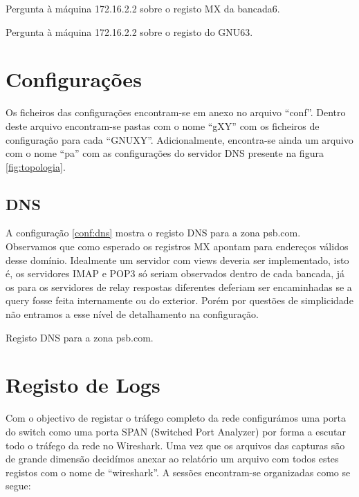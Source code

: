 \documentclass[a4paper,12pt]{article}
\begin{document}
\begin{program}
	
  \caption{Pergunta à máquina 172.16.2.2 sobre o registo MX da bancada6.}
	\label{log:172mx}
\end{program}

\begin{program}
	
  \caption{Pergunta à máquina 172.16.2.2 sobre o registo do GNU63.}
	\label{log:172a}
\end{program}


\section{Configurações}

Os ficheiros das configurações encontram-se em anexo no arquivo ``conf''.
Dentro deste arquivo encontram-se pastas com o nome ``gXY'' com os ficheiros
de configuração para cada ``GNUXY''. Adicionalmente, encontra-se ainda um
arquivo com o nome ``pa'' com as configurações do servidor DNS presente na 
figura \ref{fig:topologia}.

\subsection{DNS}

A configuração \ref{conf:dns} mostra o registo DNS para a zona psb.com.
Observamos que como esperado os registros MX apontam para endereços válidos
desse domínio. Idealmente um servidor com views deveria ser implementado, isto
é, os servidores IMAP e POP3 só seriam observados dentro de cada bancada, já os
para os servidores de relay respostas diferentes deferiam ser encaminhadas se a
query fosse feita internamente ou do exterior.
Porém por questões de simplicidade não entramos a esse nível de detalhamento na
configuração.

\begin{config}
	
  \caption{Registo DNS para a zona psb.com.}
	\label{conf:dns}
\end{config}


\section{Registo de Logs}

Com o objectivo de registar o tráfego completo da rede configurámos uma porta
do switch como uma porta SPAN (Switched Port Analyzer) por forma a escutar todo
o tráfego da rede no Wireshark.
Uma vez que os arquivos das capturas são de grande dimensão decidímos anexar 
ao relatório um arquivo com todos estes registos com o nome de ``wireshark''. 
A sessões encontram-se organizadas como se segue:
\end{document}
